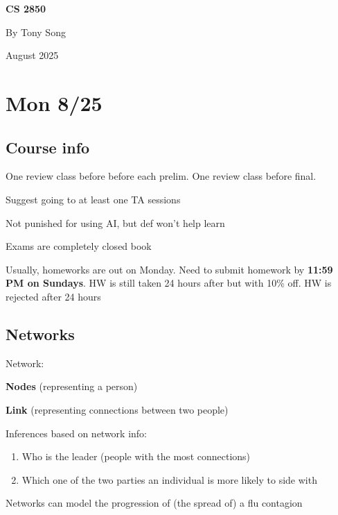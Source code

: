 \documentclass[14pt, letterpaper, oneside]{extarticle}
\begin{document}

\begin{titlepage}
    \vspace*{\fill} %
    \centering
    {\Huge \textbf{CS 2850} \par}
    {\vspace{2cm}}
    {\LARGE By Tony Song \par}
    {\vspace{2cm}}
    {\LARGE August 2025 \par}
    \vspace*{\fill}
\end{titlepage}

\newpage
\tableofcontents

\newpage
\section{Mon 8/25}
\subsection{Course info}

One review class before before each prelim. One review class before final.

Suggest going to at least one TA sessions

Not punished for using AI, but def won't help learn

Exams are completely closed book

Usually, homeworks are out on Monday. Need to submit homework by \textbf{11:59 PM on Sundays}.
HW is still taken 24 hours after but with 10\% off. HW is rejected after 24 hours 

\subsection{Networks}
Network:

\textbf{Nodes} (representing a person)

\textbf{Link} (representing connections between two people)

Inferences based on network info:
\begin{enumerate}
    \item Who is the leader (people with the most connections)
    \item Which one of the two parties an individual is more likely to side with
\end{enumerate}

Networks can model the progression of (the spread of) a flu contagion
\end{document}
